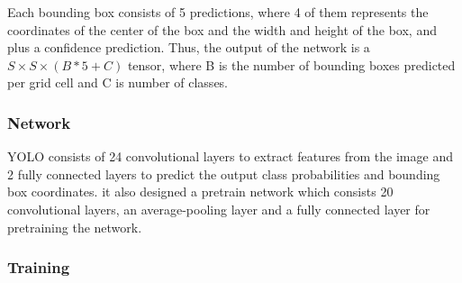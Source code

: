 Each bounding box consists of 5 predictions, where 4 of them represents the coordinates of the center of the box and the width and height of the box, and plus a confidence prediction. Thus, the output of the network is a $S \times S \times (B * 5 + C)$ tensor, where B is the number of bounding boxes predicted per grid cell and C is number of classes.

\subsubsection{Network}
YOLO consists of 24 convolutional layers to extract features from the image and 2 fully connected layers to predict the output class probabilities and bounding box coordinates. it also designed a pretrain network which consists 20 convolutional layers, an average-pooling layer and a fully connected layer for pretraining the network.

\subsubsection{Training}

